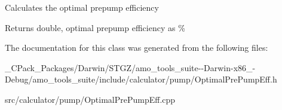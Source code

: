 Calculates the optimal prepump efficiency \begin{DoxyReturn}{Returns}
double, optimal prepump efficiency as \% 
\end{DoxyReturn}


The documentation for this class was generated from the following files\+:\begin{DoxyCompactItemize}
\item 
\+\_\+\+C\+Pack\+\_\+\+Packages/\+Darwin/\+S\+T\+G\+Z/amo\+\_\+tools\+\_\+suite-\/-\/\+Darwin-\/x86\+\_-\/\+Debug/amo\+\_\+tools\+\_\+suite/include/calculator/pump/Optimal\+Pre\+Pump\+Eff.\+h\item 
src/calculator/pump/Optimal\+Pre\+Pump\+Eff.\+cpp\end{DoxyCompactItemize}
